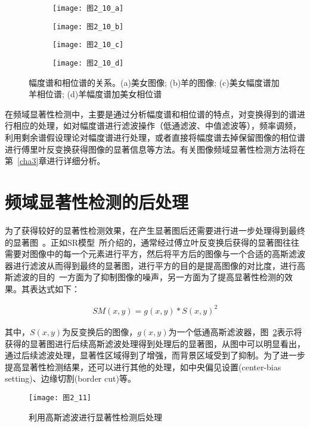 \begin{figure}[b]
  \centering%
  \begin{subfigure}{0.3\textwidth}
    \texttt{[image: 图2\_10\_a]}
    \caption{}
  \end{subfigure}
  \hspace{4em}%
  \begin{subfigure}{0.3\textwidth}
    \texttt{[image: 图2\_10\_b]}
    \caption{}
  \end{subfigure}
  \hspace{4em}%
  \begin{subfigure}{0.3\textwidth}
    \texttt{[image: 图2\_10\_c]}
    \caption{}
  \end{subfigure}
  \hspace{4em}%
  \begin{subfigure}{0.3\textwidth}
    \texttt{[image: 图2\_10\_d]}
    \caption{}
  \end{subfigure}
  \caption{幅度谱和相位谱的关系。(a)美女图像; (b)羊的图像; (c)美女幅度谱加羊相位谱; (d)羊幅度谱加美女相位谱}
  \label{图2_10}
\end{figure}

在频域显著性检测中，主要是通过分析幅度谱和相位谱的特点，对变换得到的谱进行相应的处理，如对幅度谱进行滤波操作（低通滤波、中值滤波等），频率调频，利用剩余谱假设理论对幅度谱进行处理，或者直接将幅度谱去掉保留图像的相位谱进行傅里叶反变换获得图像的显著信息等方法。有关图像频域显著性检测方法将在第~\ref{cha3}章进行详细分析。

\section{频域显著性检测的后处理}
\label{2_4}

为了获得较好的显著性检测效果，在产生显著图后还需要进行进一步处理得到最终的显著图~\cite{BorjiTIP2013Quantitative}。正如SR模型~\cite{HouXiaodiCVPR2007Residual}所介绍的，通常经过傅立叶反变换后获得的显著图往往需要对图像中的每一个元素进行平方，然后将平方后的图像与一个合适的高斯滤波器进行滤波从而得到最终的显著图，进行平方的目的是提高图像的对比度，进行高斯滤波的目的~\cite{ZhangLiming2010Book}一方面为了抑制图像的噪声，另一方面为了提高显著性检测的效果。其表达式如下：
\begin{linenomath}
\begin{align}
SM(x,y)=g(x,y)\ast S(x,y)^{2}
\label{式2_37}
\end{align}
\end{linenomath}
其中，$S(x,y)$为反变换后的图像，$g(x,y)$为一个低通高斯滤波器，图~\ref{图2_11}表示将获得的显著图进行后续高斯滤波处理得到处理后的显著图，从图中可以明显看出，通过后续滤波处理，显著性区域得到了增强，而背景区域受到了抑制。为了进一步提高显著性检测结果，还可以进行其他的处理，如中央偏见设置(center-bias setting)、边缘切割(border cut)等。
\begin{figure}[h] %
  \centering
  \texttt{[image: 图2\_11]}
  \caption{利用高斯滤波进行显著性检测后处理}
  \label{图2_11}
\end{figure}

